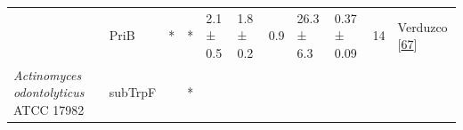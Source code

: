\documentclass[12pt,twoside]{reedthesis}
\begin{document}
\begin{longtable}[]{@{}lllllllllll@{}}
\begin{minipage}[t]{0.15\columnwidth}
  \end{minipage} & \begin{minipage}[t]{0.05\columnwidth}\raggedright\strut
  PriB\strut
  \end{minipage} & \begin{minipage}[t]{0.04\columnwidth}\raggedright\strut
  *\strut
  \end{minipage} & \begin{minipage}[t]{0.04\columnwidth}\raggedright\strut
  *\strut
  \end{minipage} & \begin{minipage}[t]{0.06\columnwidth}\raggedright\strut
  2.1 ± 0.5\strut
  \end{minipage} & \begin{minipage}[t]{0.06\columnwidth}\raggedright\strut
  1.8 ± 0.2\strut
  \end{minipage} & \begin{minipage}[t]{0.06\columnwidth}\raggedright\strut
  0.9\strut
  \end{minipage} & \begin{minipage}[t]{0.05\columnwidth}\raggedright\strut
  26.3 ± 6.3\strut
  \end{minipage} & \begin{minipage}[t]{0.05\columnwidth}\raggedright\strut
  0.37 ± 0.09\strut
  \end{minipage} & \begin{minipage}[t]{0.03\columnwidth}\raggedright\strut
  14\strut
  \end{minipage} & \begin{minipage}[t]{0.11\columnwidth}\raggedright\strut
  Verduzco
  {[}\protect\hyperlink{ref-verduzco-castro_co-occurrence_2016}{67}{]}\strut
  \end{minipage}\tabularnewline
  \begin{minipage}[t]{0.15\columnwidth}\raggedright\strut
  \emph{Actinomyces odontolyticus} ATCC 17982\strut
  \end{minipage} & \begin{minipage}[t]{0.05\columnwidth}\raggedright\strut
  subTrpF\strut
  \end{minipage} & \begin{minipage}[t]{0.04\columnwidth}\raggedright\strut
  \strut
  \end{minipage} & \begin{minipage}[t]{0.04\columnwidth}\raggedright\strut
  *\strut
  \end{minipage} & \begin{minipage}[t]{0.06\columnwidth}\raggedright\strut

\end{minipage}
\end{longtable}
\end{document}
